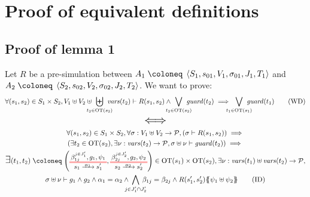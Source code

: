 \documentclass{article}
\begin{document}
\section{Proof of equivalent definitions}\label{apx:lemeqd}

\subsection{Proof of lemma 1}
Let \(R\) be a pre-simulation between \(A_1 \defobject \OA{S_1}{s_{01}}{V_1}{\sigma_{01}}{J_1}{T_1}\) and \(A_2 \defobject \OA{S_2}{s_{02}}{V_2}{\sigma_{02}}{J_2}{T_2}\).
We want to prove:
\[ \forall \mpar{s_1, s_2} \in S_1 \times S_2, V_1 \uplus V_2 \uplus \biguplus_\subbox{t_2 \in \fOT{s_2}} \fvars{t_2} \vdash R\mpar{s_1, s_2} \wedge \bigvee_\subbox{t_2 \in \fOT{s_2}} \fguard{t_2} \implies \bigvee_\subbox{t_1 \in \fOT{s_1}} \fguard{t_1} \tag{WD}\label{eq:drWD} \]
\[ \text{\Large\(\displaystyle \iff\)} \]
\begin{multline}
	\forall \mpar{s_1, s_2} \in S_1 \times S_2, \forall \sigma: V_1 \uplus V_2 \to \values, \mpar{\sigma \vdash R\mpar{s_1, s_2}} \implies \\
	\mpar{\exists t_2 \in \fOT{s_2}, \exists \nu: \fvars{t_2} \to \values, \sigma \uplus \nu \vdash \fguard{t_2}} \implies \\
	\bigsymb{\exists} \mpar{t_1, t_2} \defobject \mpar{\OTx{1}{}{1}{1}, \OTx{2}{}{2}{2}} \in \fOT{s_1} \times \fOT{s_2}, \exists \nu: \fvars{t_1} \uplus \fvars{t_2} \to \values, \\
	\sigma \uplus \nu \vdash g_1 \wedge g_2 \wedge \alpha_1 = \alpha_2 \wedge \bigwedge_\subbox{j \in J'_1 \cap J'_2} \beta_{1j} = \beta_{2j} \wedge R\mpar{s'_1, s'_2}\psubst{\psi_1 \uplus \psi_2}\tag{ID}\label{eq:drID}
\end{multline}
\end{document}
